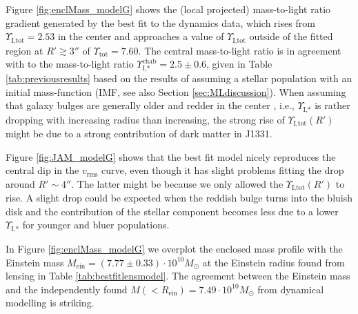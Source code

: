 
Figure \ref{fig:enclMass_modelG} shows the (local projected) mass-to-light ratio gradient generated by the best fit to the dynamics data, which rises from $\Upsilon_\text{I,tot} = 2.53$ in the center and approaches a value of $\Upsilon_\text{I,tot}$ outside of the fitted region at $R'\gtrsim 3''$ of $\Upsilon_\text{tot} = 7.60$. The central mass-to-light ratio is in agreement with to the mass-to-light ratio $\Upsilon_\text{I,*}^\text{chab} = 2.5 \pm 0.6$, given in Table \ref{tab:previousresults} based on the results of \citet{SWELLSI} assuming a stellar population with an \citet{Chabrier2003} initial mass-function (IMF, see also Section \ref{sec:MLdiscussion}). When assuming that galaxy bulges are generally older and redder in the center \Wilma{[TO DO: REF]}, i.e., $\Upsilon_\text{I,*}$ is rather dropping with increasing radius than increasing, the strong rise of $\Upsilon_\text{I,tot}(R')$ might be due to a strong contribution of dark matter in J1331.

Figure \ref{fig:JAM_modelG} shows that the best fit model nicely reproduces the central dip in the $v_\text{rms}$ curve, even though it has slight problems fitting the drop around $R' \sim 4''$. The latter might be because we only allowed the $\Upsilon_\text{I,tot}(R')$ to rise. A slight drop could be expected when the reddish bulge turns into the bluish disk and the contribution of the stellar component becomes less due to a lower $\Upsilon_\text{I,*}$ for younger and bluer populations.

In Figure \ref{fig:enclMass_modelG} we overplot the enclosed mass profile with the Einstein mass $M_\text{ein} = (7.77 \pm 0.33) \cdot 10^{10} M_\odot$ at the Einstein radius found from lensing in Table \ref{tab:bestfitlensmodel}. The agreement between the Einstein mass and the independently found $M(<R_\text{ein}) = 7.49 \cdot 10^{10} M_\odot$ from dynamical modelling is striking.
